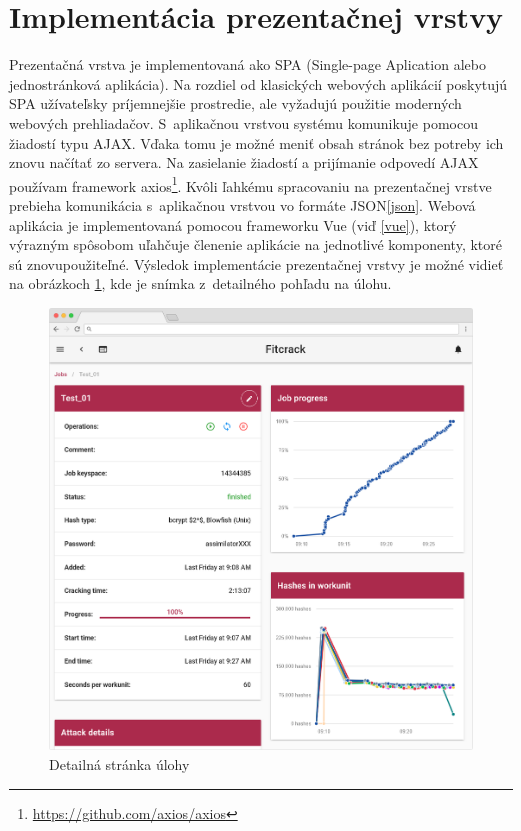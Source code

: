 \documentclass[zadani,slovak]{fitthesis}
\begin{document}
\section{Implementácia prezentačnej vrstvy}


Prezentačná vrstva je implementovaná ako SPA (Single-page Aplication alebo jednostránková aplikácia). Na rozdiel od klasických webových aplikácií poskytujú SPA užívateľsky príjemnejšie prostredie, ale vyžadujú použitie moderných webových prehliadačov. S~aplikačnou vrstvou systému komunikuje pomocou žiadostí typu AJAX. Vďaka tomu je možné meniť obsah stránok bez potreby ich znovu načítať zo servera. Na zasielanie žiadostí a prijímanie odpovedí AJAX používam framework axios\footnote{\url{https://github.com/axios/axios}}. Kvôli ľahkému spracovaniu na prezentačnej vrstve prebieha komunikácia s~aplikačnou vrstvou vo formáte JSON\ref{json}. Webová aplikácia je implementovaná pomocou frameworku Vue (viď \ref{vue}), ktorý výrazným spôsobom uľahčuje členenie aplikácie na jednotlivé komponenty, ktoré sú znovupoužiteľné. Výsledok implementácie prezentačnej vrstvy je možné vidieť na obrázkoch \ref{fig:detailPage}, kde je snímka z~detailného pohľadu na úlohu.
\begin{figure}[H]
    \centering
    \includegraphics[scale=0.25]{obrazky/jobDetail2Frame.PNG}
    \caption{Detailná stránka úlohy}
    \label{fig:detailPage}
\end{figure}
\end{document}
